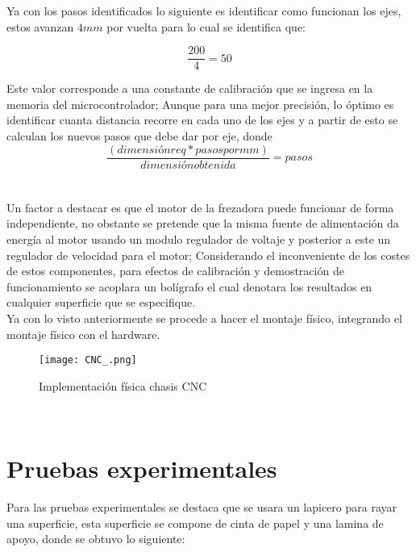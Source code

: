 \documentclass[conference]{IEEEtran}
\begin{document}
  Ya con los pasos identificados lo siguiente es identificar como funcionan los ejes, estos avanzan $4mm$ por vuelta para lo cual se identifica que:
  
   \begin{equation}
      \frac{200}{4}=50
  \end{equation}
  
  Este valor corresponde a una constante de calibración que se ingresa en la memoria del microcontrolador; Aunque para una mejor precisión, lo óptimo es identificar cuanta distancia recorre en cada uno de los ejes  y a partir de esto se calculan los nuevos pasos que debe dar por eje, donde\\
  
     \begin{equation}
      \frac{(dimensiónreq*pasospormm)}{dimensiónobtenida
} = pasos
  \end{equation}
  \\
  
 \\Un factor a destacar es que el motor de la frezadora puede funcionar de forma independiente, no obstante se pretende que la misma fuente de alimentación da energía al motor usando un modulo regulador de voltaje y posterior a este un regulador de velocidad para el motor; Considerando el inconveniente de los costes de estos componentes, para efectos de calibración y demostración de funcionamiento se acoplara un bolígrafo el cual denotara los resultados en cualquier superficie que se especifique. \\ 

Ya con lo visto anteriormente se procede a hacer el montaje físico, integrando el montaje físico con el hardware.\\

 \begin{figure}[htb]
        \centering
        \texttt{[image: CNC\_.png]}
        \caption{Implementación física chasis CNC }
        \end{figure}


\\
\section{Pruebas experimentales}
Para las pruebas experimentales se destaca que se usara un lapicero para rayar una superficie, esta superficie se compone de cinta de papel y una lamina de apoyo, donde se obtuvo lo siguiente:
\end{document}
